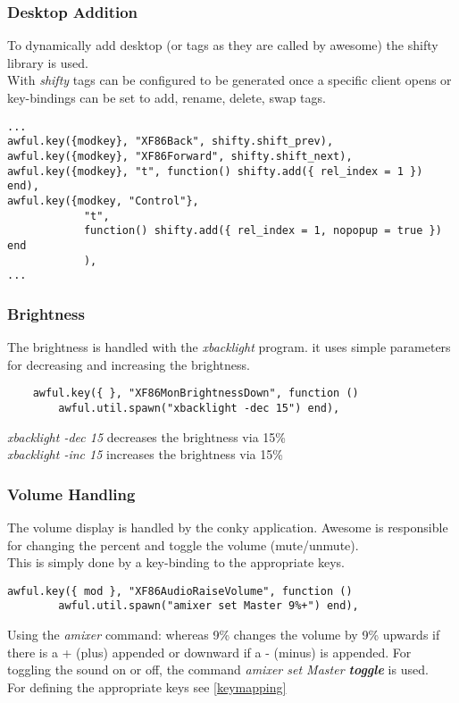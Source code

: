 			\subsubsection{Desktop Addition}
				To dynamically add desktop (or tags as they are called by awesome) the shifty library is used.\\
				With \textit{shifty} tags can be configured to be generated once a specific client opens or key-bindings can be set to add, rename, delete, swap tags.
				
				\begin{lstlisting}[caption={example of dynamic adding with shifty}]
...
awful.key({modkey}, "XF86Back", shifty.shift_prev),
awful.key({modkey}, "XF86Forward", shifty.shift_next),
awful.key({modkey}, "t", function() shifty.add({ rel_index = 1 }) end),
awful.key({modkey, "Control"},
            "t",
            function() shifty.add({ rel_index = 1, nopopup = true }) end
            ),
...
				\end{lstlisting}
				
			\subsubsection{Brightness}
				The brightness is handled with the \textit{xbacklight} program. it uses simple parameters for decreasing and increasing the brightness.
				\begin{lstlisting}
    awful.key({ }, "XF86MonBrightnessDown", function ()
        awful.util.spawn("xbacklight -dec 15") end),
				\end{lstlisting}
				\textit{xbacklight -dec 15} decreases the brightness via 15\%\\
				\textit{xbacklight -inc 15} increases the brightness via 15\%
				
			\subsubsection{Volume Handling}
				The volume display is handled by the conky application. Awesome is responsible for changing the percent and toggle the volume (mute/unmute).\\
				This is simply done by a key-binding to the appropriate keys.
				\begin{lstlisting}
awful.key({ mod }, "XF86AudioRaiseVolume", function ()
		awful.util.spawn("amixer set Master 9%+") end),
				\end{lstlisting}
				Using the \textit{amixer} command: whereas 9\% changes the volume by 9\% upwards if there is a + (plus) appended or downward if a - (minus) is appended. For toggling the sound on or off, the command \textit{amixer set Master \textbf{toggle}} is used.\\
				For defining the appropriate keys see \ref{keymapping}
				
